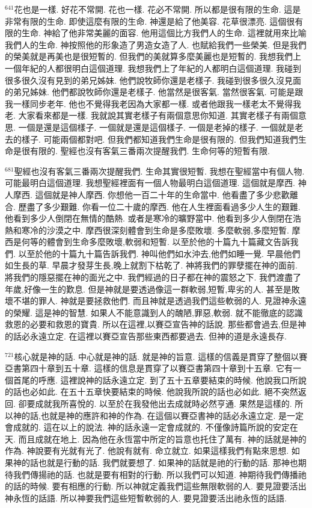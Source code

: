 \documentclass{book}
\begin{document}
$^{641}$花也是一樣.
好花不常開.
花也一樣.
花必不常開.
所以都是很有限的生命.
這是非常有限的生命.
即使這麼有限的生命.
神還是給了他美容.
花草很漂亮.
這個很有限的生命.
神給了他非常美麗的面容.
他用這個比方我們人的生命.
這裡就用來比喻我們人的生命.
神按照他的形象造了男造女造了人.
也賦給我們一些榮美.
但是我們的榮美就是再美也是很短暫的.
但我們的美就算多麼美麗也是短暫的.
我想我們上一個年紀的人都很明白這個道理.
我想我們上了年紀的人都明白這個道理.
我碰到很多很久沒有見到的弟兄姊妹.
他們說牧師你還是老樣子.
我碰到很多很久沒見面的弟兄姊妹.
他們都說牧師你還是老樣子.
他當然是很客氣.
當然很客氣.
可能是跟我一樣同步老年.
他也不覺得我老因為大家都一樣.
或者他跟我一樣老太不覺得我老.
大家看來都是一樣.
我就說其實老樣子有兩個意思你知道.
其實老樣子有兩個意思.
一個是還是這個樣子.
一個就是還是這個樣子.
一個是老掉的樣子.
一個就是老去的樣子.
可能兩個都對吧.
但我們都知道我們生命是很有限的.
但我們知道我們生命是很有限的.
聖經也沒有客氣三番兩次提醒我們.
生命何等的短暫有限.

$^{681}$聖經也沒有客氣三番兩次提醒我們.
生命其實很短暫.
我想在聖經當中有個人物.
可能最明白這個道理.
我想聖經裡面有一個人物最明白這個道理.
這個就是摩西.
神人摩西.
這個就是神人摩西.
你想他一百二十年的生命當中.
他看盡了多少悲歡離合.
歷盡了多少艱難.
你看一位二十歲的摩西.
他在人生裡面看過多少人生的艱難.
他看到多少人倒閉在無情的酷熱.
或者是寒冷的曠野當中.
他看到多少人倒閉在浩熱和寒冷的沙漠之中.
摩西很深刻體會到生命是多麼敗壞.
多麼軟弱,多麼短暫.
摩西是何等的體會到生命多麼敗壞,軟弱和短暫.
以至於他的十篇九十篇藏文告訴我們.
以至於他的十篇九十篇告訴我們.
神叫他們如水沖去,他們如睡一覺.
早晨他們如生長的草.
早晨才發芽生長,晚上就割下枯乾了.
神將我們的罪孽擺在神的面前.
將我們的隱惡擺在神的面光之中.
我們經過的日子都在神的震怒之下.
我們渡盡了年歲,好像一生的歎息.
但是神就是要透過像這一群軟弱,短暫,卑劣的人.
甚至是敗壞不堪的罪人.
神就是要拯救他們.
而且神就是透過我們這些軟弱的人.
見證神永遠的榮耀.
這是神的智慧.
如果人不能意識到人的醜陋,罪惡,軟弱.
就不能徹底的認識救恩的必要和救恩的寶貴.
所以在這裡,以賽亞宣告神的話說.
那些都會過去,但是神的話必永遠立定.
在這裡以賽亞宣告那些東西都要過去.
但神的道是永遠長存.

$^{721}$核心就是神的話.
中心就是神的話.
就是神的旨意.
這樣的信義是貫穿了整個以賽亞書第四十章到五十章.
這樣的信息是貫穿了以賽亞書第四十章到十五章.
它有一個首尾的呼應.
這裡說神的話永遠立定.
到了五十五章要結束的時候.
他說我口所說的話也必如此.
在五十五章快要結束的時候.
他說我所說的話也必如此.
絕不突然返回.
卻要成就我所喜悅的.
以至於在我發他出去成就時必然亨通.
果然是這樣的.
所以神的話,也就是神的應許和神的作為.
在這個以賽亞書神的話必永遠立定.
是一定會成就的.
這在以上的說法.
神的話永遠一定會成就的.
不僅像詩篇所說的安定在天.
而且成就在地上.
因為他在永恆當中所定的旨意也托住了萬有.
神的話就是神的作為.
神說要有光就有光了.
他說有就有.
命立就立.
如果這樣我們有點來思想.
如果神的話也就是行動的話.
我們就要想了.
如果神的話就是祂的行動的話.
那神也期待我們傳揚祂的話.
也就是要有相對的行動.
所以我們可以知道.
神期待我們傳播祂的話的時候.
要有相應的行動.
所以神就定義我們這些無限軟弱的人.
要見證要活出神永恆的話語.
所以神要我們這些短暫軟弱的人.
要見證要活出祂永恆的話語.
\end{document}
